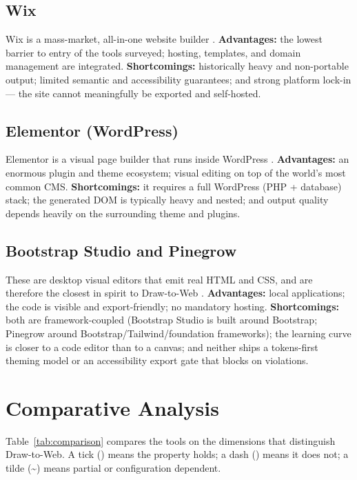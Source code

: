 \subsection{Wix}
Wix is a mass-market, all-in-one website builder \cite{wix}. \textbf{Advantages:}
the lowest barrier to entry of the tools surveyed; hosting, templates, and domain
management are integrated. \textbf{Shortcomings:} historically heavy and
non-portable output; limited semantic and accessibility guarantees; and strong
platform lock-in --- the site cannot meaningfully be exported and self-hosted.

\subsection{Elementor (WordPress)}
Elementor is a visual page builder that runs inside WordPress \cite{elementor}.
\textbf{Advantages:} an enormous plugin and theme ecosystem; visual editing on top
of the world's most common CMS. \textbf{Shortcomings:} it requires a full WordPress
(PHP + database) stack; the generated DOM is typically heavy and nested; and output
quality depends heavily on the surrounding theme and plugins.

\subsection{Bootstrap Studio and Pinegrow}
These are desktop visual editors that emit real HTML and CSS, and are therefore the
closest in spirit to Draw-to-Web \cite{bootstrapstudio,pinegrow}.
\textbf{Advantages:} local applications; the code is visible and export-friendly;
no mandatory hosting. \textbf{Shortcomings:} both are framework-coupled (Bootstrap
Studio is built around Bootstrap; Pinegrow around Bootstrap/Tailwind/foundation
frameworks); the learning curve is closer to a code editor than to a canvas; and
neither ships a tokens-first theming model or an accessibility export gate that
blocks on violations.

\section{Comparative Analysis}
Table~\ref{tab:comparison} compares the tools on the dimensions that distinguish
Draw-to-Web. A tick (\checkmark) means the property holds; a dash (\textemdash)
means it does not; a tilde (\textasciitilde) means partial or configuration
dependent.

